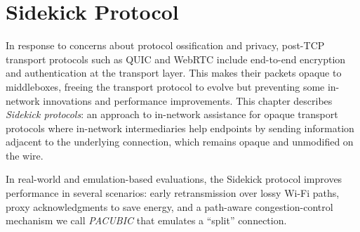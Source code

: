 \chapter{Sidekick Protocol}
\label{sec:sidekick}

In response to concerns about protocol ossification and privacy, post-TCP
transport protocols such as QUIC and Web\-RTC include end-to-end encryption and
authentication at the transport layer. This makes their packets opaque to
middleboxes, freeing the transport protocol to evolve but preventing some
in-network innovations and performance improvements. This chapter describes
\emph{Sidekick protocols}: an approach to in-network assistance for opaque
transport protocols where in-network intermediaries help endpoints by sending
information adjacent to the underlying connection, which remains opaque and
unmodified on the wire.

In real-world and emulation-based evaluations, the Sidekick protocol improves
performance in several scenarios: early retransmission over lossy Wi-Fi paths,
proxy acknowledgments to save energy, and a path-aware congestion-control
mechanism we call \emph{PACUBIC} that emulates a ``split'' connection.







